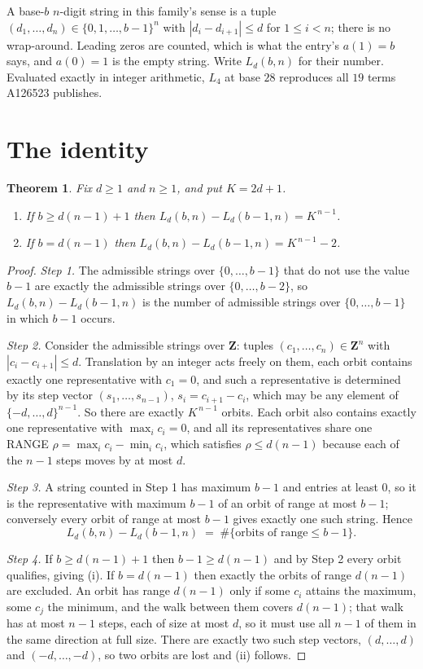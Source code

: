 \documentclass[11pt,a4paper]{article}
\theoremstyle{plain}
\newtheorem{theorem}{Theorem}
\theoremstyle{definition}
\begin{document}
A base-$b$ $n$-digit string in this family's sense is a tuple
$(d_1,\dots,d_n)\in\{0,1,\dots,b-1\}^{n}$ with $|d_i-d_{i+1}|\le d$ for $1\le i<n$; there
is no wrap-around. Leading zeros are counted, which is what the entry's $a(1)=b$ says, and
$a(0)=1$ is the empty string. Write $L_d(b,n)$ for their number. Evaluated exactly in integer
arithmetic, $L_{4}$ at base $28$ reproduces all $19$ terms A126523 publishes.

\section{The identity}

\begin{theorem}
Fix $d\ge1$ and $n\ge1$, and put $K=2d+1$.
\begin{enumerate}
\item[(i)] If $b\ge d(n-1)+1$ then $L_d(b,n)-L_d(b-1,n)=K^{\,n-1}$.
\item[(ii)] If $b=d(n-1)$ then $L_d(b,n)-L_d(b-1,n)=K^{\,n-1}-2$.
\end{enumerate}
\end{theorem}

\begin{proof}
\emph{Step 1.} The admissible strings over $\{0,\dots,b-1\}$ that do not use the value $b-1$
are exactly the admissible strings over $\{0,\dots,b-2\}$, so $L_d(b,n)-L_d(b-1,n)$ is the
number of admissible strings over $\{0,\dots,b-1\}$ in which $b-1$ occurs.

\emph{Step 2.} Consider the admissible strings over $\mathbf{Z}$: tuples
$(c_1,\dots,c_n)\in\mathbf{Z}^{n}$ with $|c_i-c_{i+1}|\le d$. Translation by an integer acts
freely on them, each orbit contains exactly one representative with $c_1=0$, and such a
representative is determined by its step vector $(s_1,\dots,s_{n-1})$, $s_i=c_{i+1}-c_i$,
which may be any element of $\{-d,\dots,d\}^{n-1}$. So there are exactly $K^{\,n-1}$ orbits.
Each orbit also contains exactly one representative with $\max_i c_i=0$, and all its
representatives share one RANGE $\rho=\max_ic_i-\min_ic_i$, which satisfies
$\rho\le d(n-1)$ because each of the $n-1$ steps moves by at most $d$.

\emph{Step 3.} A string counted in Step 1 has maximum $b-1$ and entries at least $0$, so it is
the representative with maximum $b-1$ of an orbit of range at most $b-1$; conversely every orbit
of range at most $b-1$ gives exactly one such string. Hence
\[
L_d(b,n)-L_d(b-1,n)\;=\;\#\{\text{orbits of range}\le b-1\} .
\]

\emph{Step 4.} If $b\ge d(n-1)+1$ then $b-1\ge d(n-1)$ and by Step 2 every orbit qualifies,
giving (i). If $b=d(n-1)$ then exactly the orbits of range $d(n-1)$ are excluded. An orbit has
range $d(n-1)$ only if some $c_i$ attains the maximum, some $c_j$ the minimum, and the walk
between them covers $d(n-1)$; that walk has at most $n-1$ steps, each of size at most $d$, so it
must use all $n-1$ of them in the same direction at full size. There are exactly two such step
vectors, $(d,\dots,d)$ and $(-d,\dots,-d)$, so two orbits are lost and (ii) follows.
\end{proof}
\end{document}
